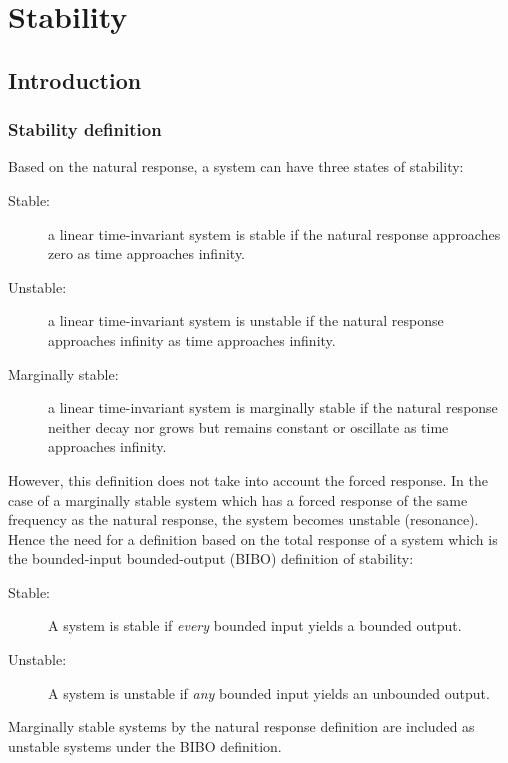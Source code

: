 \documentclass[10pt, twocolumn]{article}
\begin{document}
\section{Stability}
\subsection{Introduction}
\subsubsection{Stability definition}
Based on the natural response, a system can have three states of stability:
\begin{description}
  \item[Stable:] a linear time-invariant system is stable if the natural response approaches zero as time approaches infinity.
  \item[Unstable:] a linear time-invariant system is unstable if the natural response approaches infinity as time approaches infinity.
  \item[Marginally stable:] a linear time-invariant system is marginally stable if the natural response neither decay nor grows but remains constant or oscillate as time approaches infinity.
\end{description}

However, this definition does not take into account the forced response.
In the case of a marginally stable system which has a forced response of the same frequency as the natural response, the system becomes unstable (resonance).
Hence the need for a definition based on the total response of a system which is the bounded-input bounded-output (BIBO) definition of stability:
\begin{description}
  \item[Stable:] A system is stable if \emph{every} bounded input yields a bounded output.
  \item[Unstable:] A system is unstable if \emph{any} bounded input yields an unbounded output.
\end{description}

\begin{remark}
  Marginally stable systems by the natural response definition are included as unstable systems under the BIBO definition.
\end{remark}
\end{document}

